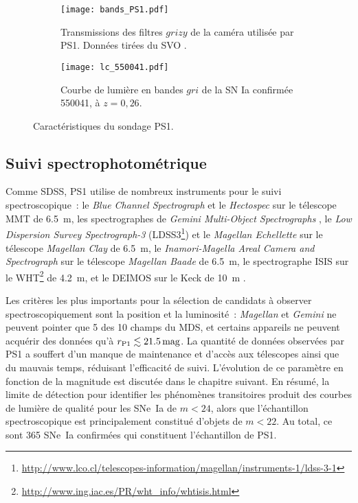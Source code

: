 \documentclass[../main/main.tex]{subfiles}
\begin{document}
\begin{figure}[ht]
    \centering
    \begin{subfigure}[]{.49\linewidth}
        \centering
        \texttt{[image: bands\_PS1.pdf]}
        \caption{Transmissions des filtres $grizy$ de la caméra utilisée par
        PS1. Données tirées du SVO \citep{rodrigo2020}.}
        \label{fig:ps1bands}
    \end{subfigure}
    \begin{subfigure}[]{.49\linewidth}
        \centering
        \texttt{[image: lc\_550041.pdf]}
        \caption{Courbe de lumière en bandes $gri$ de la SN Ia confirmée 550041,
        à $z = 0,26$.}
        \label{fig:lc_550041}
    \end{subfigure}
    \caption{Caractéristiques du sondage PS1.}
\end{figure}

\subsection{Suivi spectrophotométrique}\label{ssec:ps1spectro}

Comme SDSS, PS1 utilise de nombreux instruments pour le suivi
spectroscopique~: le \textit{Blue Channel Spectrograph} \citep{schmidt1989} et
le \textit{Hectospec} \citep{fabricant2005} sur le télescope MMT de \SI{6,5}{m},
les spectrographes de \textit{Gemini Multi-Object Spectrographs}
\citep[GMOS,][]{hook2004}, le \textit{Low Dispersion Survey Spectrograph-3}
(LDSS3\footnote{\href{http://www.lco.cl/telescopes-information/magellan/instruments-1/ldss-3-1}
{http://www.lco.cl/telescopes-information/magellan/instruments-1/ldss-3-1}}) et
le \textit{Magellan Echellette} \citep[MagE,][]{marshall2008} sur le télescope
\textit{Magellan Clay} de \SI{6,5}{m}, le \textit{Inamori-Magella Areal Camera
and Spectrograph} \citep[IMACS,][]{dressler2011} sur le télescope
\textit{Magellan Baade} de \SI{6,5}{m}, le spectrographe ISIS sur le
WHT\footnote{\href{http://www.ing.iac.es/PR/wht_info/whtisis.html}
{http://www.ing.iac.es/PR/wht\_info/whtisis.html}} de \SI{4,2}{m}, et le DEIMOS
\citep{faber2003} sur le Keck de \SI{10}{m} \citep{oke1995}.

Les critères les plus importants pour la sélection de candidats à observer
spectroscopiquement sont la position et la luminosité~: \textit{Magellan} et
\textit{Gemini} ne peuvent pointer que 5 des 10 champs du MDS, et certains
appareils ne peuvent acquérir des données qu'à $r_{\rm P1} \lesssim
\SI{21,5}{mag}$. La quantité de données observées par PS1 a souffert d'un manque
de maintenance et d'accès aux télescopes ainsi que du mauvais temps, réduisant
l'efficacité de suivi. L'évolution de ce paramètre en fonction de la magnitude
est discutée dans le chapitre suivant. En résumé, la limite de détection pour
identifier les phénomènes transitoires produit des courbes de lumière de qualité
pour les SNe~Ia de $m < 24$, alors que l'échantillon spectroscopique est
principalement constitué d'objets de $m < 22$. Au total, ce sont 365 SNe~Ia
confirmées qui constituent l'échantillon de PS1.
\end{document}
